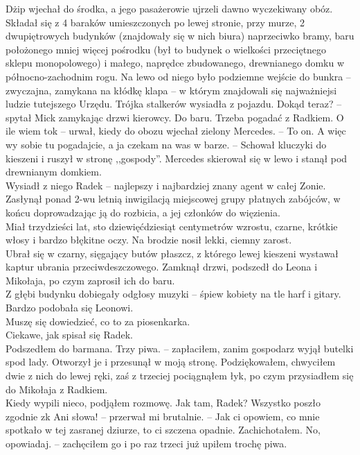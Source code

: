 \documentclass[../MAIN.tex]{subfiles}
\begin{document}
Dżip wjechał do środka, a jego pasażerowie ujrzeli dawno wyczekiwany obóz. \\
Składał się z 4 baraków umieszczonych po lewej stronie, przy murze, 2 dwupiętrowych budynków (znajdowały się w nich biura) naprzeciwko bramy, baru położonego mniej więcej pośrodku (był to budynek o wielkości przeciętnego sklepu monopolowego) i małego, naprędce zbudowanego, drewnianego domku w północno-zachodnim rogu. Na lewo od niego było podziemne wejście do bunkra -- zwyczajna, zamykana na kłódkę klapa -- w którym znajdowali się najważniejsi ludzie tutejszego Urzędu.
Trójka stalkerów wysiadła z pojazdu.
%
\sx Dokąd teraz? -- spytał Mick zamykając drzwi kierowcy.
\xx Do baru. Trzeba pogadać z Radkiem.
\xx O ile wiem to\3k -- urwał, kiedy do obozu wjechał zielony Mercedes. -- To on. A więc wy sobie tu pogadajcie, a ja czekam na was w barze. -- Schował kluczyki do kieszeni i ruszył w stronę ,,gospody''.
\qd
Mercedes skierował się w lewo i stanął pod drewnianym domkiem. \\
Wysiadł z niego Radek -- najlepszy i najbardziej znany agent w całej Zonie. Zasłynął ponad 2-wu letnią inwigilacją miejscowej grupy płatnych zabójców, w końcu doprowadzając ją do rozbicia, a jej członków do więzienia. \\
Miał trzydzieści lat, sto dziewięćdziesiąt centymetrów wzrostu, czarne, krótkie włosy i bardzo błękitne oczy. Na brodzie nosił lekki, ciemny zarost. \\
Ubrał się w czarny, sięgający butów płaszcz, z którego lewej kieszeni wystawał kaptur ubrania przeciwdeszczowego.
Zamknął drzwi, podszedł do Leona i Mikołaja, po czym zaprosił ich do baru. \\
Z głębi budynku dobiegały odgłosy muzyki -- śpiew kobiety na tle harf i gitary. Bardzo podobała się Leonowi. \\
Muszę się dowiedzieć, co to za piosenkarka. \\
Ciekawe, jak spisał się Radek. \\
Podszedłem do barmana.
\sx Trzy piwa. -- zapłaciłem, zanim gospodarz wyjął butelki spod lady.
\qd
Otworzył je i przesunął w moją stronę. Podziękowałem, chwyciłem dwie z nich do lewej ręki, zaś z trzeciej pociągnąłem łyk, po czym przysiadłem się do Mikołaja z Radkiem. \\
Kiedy wypili nieco, podjąłem rozmowę.
%
\sx Jak tam, Radek? Wszystko poszło zgodnie z\3k
\xx Ani słowa! -- przerwał mi brutalnie. -- Jak ci opowiem, co mnie spotkało w tej zasranej dziurze, to ci szczena opadnie.
\qd
Zachichotałem.
%
\sx No, opowiadaj. -- zachęciłem go i po raz trzeci już upiłem trochę piwa.
\end{document}
